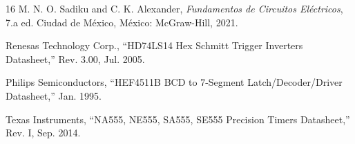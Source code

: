 \documentclass[12pt, journal, onecolumn]{IEEEtran}
\begin{document}
\begin{thebibliography}{16}
M. N. O. Sadiku and C. K. Alexander, \textit{Fundamentos de Circuitos Eléctricos}, 7.a ed. Ciudad de México, México: McGraw-Hill, 2021.

Renesas Technology Corp., ``HD74LS14 Hex Schmitt Trigger Inverters Datasheet,'' Rev. 3.00, Jul. 2005.

Philips Semiconductors, ``HEF4511B BCD to 7-Segment Latch/Decoder/Driver Datasheet,'' Jan. 1995.

Texas Instruments, ``NA555, NE555, SA555, SE555 Precision Timers Datasheet,'' Rev. I, Sep. 2014.

\end{thebibliography}
\end{document}
